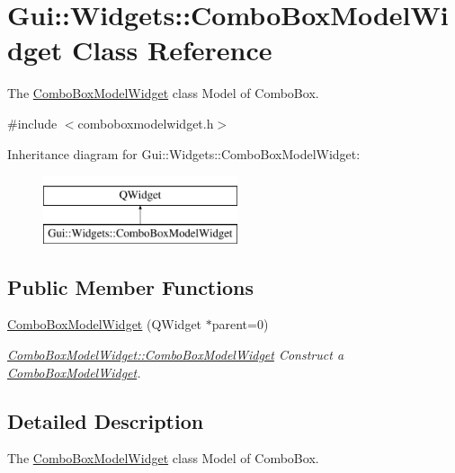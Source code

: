 \hypertarget{classGui_1_1Widgets_1_1ComboBoxModelWidget}{}\section{Gui\+:\+:Widgets\+:\+:Combo\+Box\+Model\+Widget Class Reference}
\label{classGui_1_1Widgets_1_1ComboBoxModelWidget}


The \hyperlink{classGui_1_1Widgets_1_1ComboBoxModelWidget}{Combo\+Box\+Model\+Widget} class Model of Combo\+Box.  




{\ttfamily \#include $<$comboboxmodelwidget.\+h$>$}

Inheritance diagram for Gui\+:\+:Widgets\+:\+:Combo\+Box\+Model\+Widget\+:\begin{figure}[H]
\begin{center}
\leavevmode
\includegraphics[height=2.000000cm]{d2/de0/classGui_1_1Widgets_1_1ComboBoxModelWidget}
\end{center}
\end{figure}
\subsection*{Public Member Functions}
\begin{DoxyCompactItemize}
\item 
\hyperlink{classGui_1_1Widgets_1_1ComboBoxModelWidget_afeca0199adce7d17dc440e8fa546c9e5}{Combo\+Box\+Model\+Widget} (Q\+Widget $\ast$parent=0)
\begin{DoxyCompactList}\small\item\em \hyperlink{classGui_1_1Widgets_1_1ComboBoxModelWidget_afeca0199adce7d17dc440e8fa546c9e5}{Combo\+Box\+Model\+Widget\+::\+Combo\+Box\+Model\+Widget} Construct a \hyperlink{classGui_1_1Widgets_1_1ComboBoxModelWidget}{Combo\+Box\+Model\+Widget}. \end{DoxyCompactList}\end{DoxyCompactItemize}


\subsection{Detailed Description}
The \hyperlink{classGui_1_1Widgets_1_1ComboBoxModelWidget}{Combo\+Box\+Model\+Widget} class Model of Combo\+Box. 

